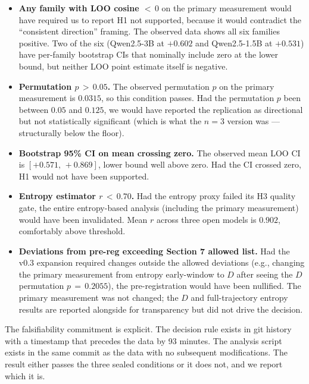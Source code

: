 \documentclass[11pt,letterpaper]{article}
\begin{document}
\begin{itemize}[leftmargin=18pt,itemsep=2pt,topsep=3pt]
\item \textbf{Any family with LOO cosine $<\,0$} on the primary measurement
would have required us to report H1 not supported, because it would
contradict the ``consistent direction'' framing. The observed data shows
all six families positive. Two of the six (Qwen2.5-3B at $+0.602$ and
Qwen2.5-1.5B at $+0.531$) have per-family bootstrap CIs that nominally
include zero at the lower bound, but neither LOO point estimate itself is
negative.
\item \textbf{Permutation $p\,>\,0.05$.} The observed permutation $p$ on
the primary measurement is $0.0315$, so this condition passes. Had the
permutation $p$ been between $0.05$ and $0.125$, we would have reported the
replication as directional but not statistically significant (which is
what the $n\!=\!3$ version was --- structurally below the floor).
\item \textbf{Bootstrap 95\% CI on mean crossing zero.} The observed mean
LOO CI is $[+0.571,\,+0.869]$, lower bound well above zero. Had the CI
crossed zero, H1 would not have been supported.
\item \textbf{Entropy estimator $r\,<\,0.70$.} Had the entropy proxy failed
its H3 quality gate, the entire entropy-based analysis (including the
primary measurement) would have been invalidated. Mean $r$ across three
open models is $0.902$, comfortably above threshold.
\item \textbf{Deviations from pre-reg exceeding Section 7 allowed list.}
Had the v0.3 expansion required changes outside the allowed deviations
(e.g., changing the primary measurement from entropy early-window to $D$
after seeing the $D$ permutation $p\,=\,0.2055$), the pre-registration
would have been nullified. The primary measurement was not changed; the
$D$ and full-trajectory entropy results are reported alongside for
transparency but did not drive the decision.
\end{itemize}

The falsifiability commitment is explicit. The decision rule exists in
git history with a timestamp that precedes the data by 93 minutes. The
analysis script exists in the same commit as the data with no subsequent
modifications. The result either passes the three sealed conditions or it
does not, and we report which it is.

\end{document}
